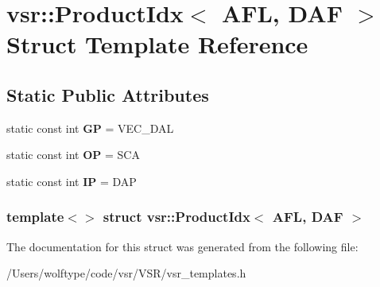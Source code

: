 \hypertarget{structvsr_1_1_product_idx_3_01_a_f_l_00_01_d_a_f_01_4}{\section{vsr\-:\-:Product\-Idx$<$ A\-F\-L, D\-A\-F $>$ Struct Template Reference}
\label{structvsr_1_1_product_idx_3_01_a_f_l_00_01_d_a_f_01_4}
}
\subsection*{Static Public Attributes}
\begin{DoxyCompactItemize}
\item 
\hypertarget{structvsr_1_1_product_idx_3_01_a_f_l_00_01_d_a_f_01_4_a3de1a76033100e30321f0f5bc8a0584d}{static const int {\bfseries G\-P} = V\-E\-C\-\_\-\-D\-A\-L}\label{structvsr_1_1_product_idx_3_01_a_f_l_00_01_d_a_f_01_4_a3de1a76033100e30321f0f5bc8a0584d}

\item 
\hypertarget{structvsr_1_1_product_idx_3_01_a_f_l_00_01_d_a_f_01_4_a7901461aac93d773027b784b35e2e5ac}{static const int {\bfseries O\-P} = S\-C\-A}\label{structvsr_1_1_product_idx_3_01_a_f_l_00_01_d_a_f_01_4_a7901461aac93d773027b784b35e2e5ac}

\item 
\hypertarget{structvsr_1_1_product_idx_3_01_a_f_l_00_01_d_a_f_01_4_a3a3c2f3e76438eb85679cc1cf1109b29}{static const int {\bfseries I\-P} = D\-A\-P}\label{structvsr_1_1_product_idx_3_01_a_f_l_00_01_d_a_f_01_4_a3a3c2f3e76438eb85679cc1cf1109b29}

\end{DoxyCompactItemize}
\subsubsection*{template$<$$>$ struct vsr\-::\-Product\-Idx$<$ A\-F\-L, D\-A\-F $>$}



The documentation for this struct was generated from the following file\-:\begin{DoxyCompactItemize}
\item 
/\-Users/wolftype/code/vsr/\-V\-S\-R/vsr\-\_\-templates.\-h\end{DoxyCompactItemize}
